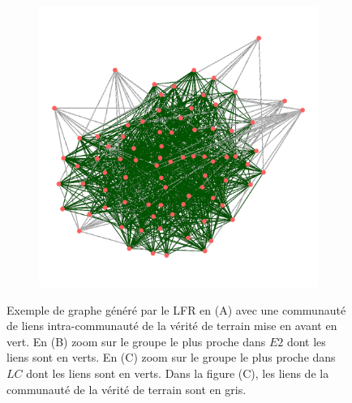 \begin{figure}
\begin{subfigure}{0.31\textwidth}
		\caption{}
		\label{fig:LFR_ExempleE2}
	\end{subfigure}
	\begin{subfigure}{0.31\textwidth}
		\includegraphics[width=\linewidth]{img/ExpectedNodes/LF/Ahn.png}
		\caption{}
		\label{fig:LFR_ExempleLC}	
	\end{subfigure}

	\caption{Exemple de graphe généré par le LFR en (A) avec une communauté de liens intra-communauté de la vérité de terrain mise en avant en vert.
	En (B) zoom sur le groupe le plus proche dans $E2$ dont les liens sont en verts.
	En (C) zoom sur le groupe le plus proche dans $LC$ dont les liens sont en verts.
	Dans la figure (C), les liens de la communauté de la vérité de terrain sont en gris. }
	\label{fig:LFR_Exemple}
\end{figure}


